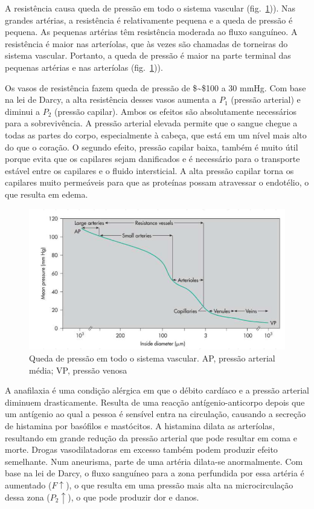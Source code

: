 \documentclass[
  portuguese,
  ]{book}
\begin{document}
A resistência causa queda de pressão em todo o sistema vascular (fig.~\ref{fig:imghemo2})). Nas grandes artérias, a resistência é relativamente pequena e a queda de pressão é pequena. As pequenas artérias têm resistência moderada ao fluxo sanguíneo. A resistência é maior nas arteríolas, que às vezes são chamadas de torneiras do sistema vascular. Portanto, a queda de pressão é maior na parte terminal das pequenas artérias e nas arteríolas (fig.~\ref{fig:imghemo2})).

Os vasos de resistência fazem queda de pressão de \$\sim\$100 a 30 mmHg. Com base na lei de Darcy, a alta resistência desses vasos aumenta a \(P_1\) (pressão arterial) e diminui a \(P_2\) (pressão capilar). Ambos os efeitos são absolutamente necessários para a sobrevivência. A pressão arterial elevada permite que o sangue chegue a todas as partes do corpo, especialmente à cabeça, que está em um nível mais alto do que o coração. O segundo efeito, pressão capilar baixa, também é muito útil porque evita que os capilares sejam danificados e é necessário para o transporte estável entre os capilares e o fluido intersticial. A alta pressão capilar torna os capilares muito permeáveis para que as proteínas possam atravessar o endotélio, o que resulta em edema.

\begin{figure}

{\centering \includegraphics{img/hemo_2} 

}

\caption{Queda de pressão em todo o sistema vascular. AP, pressão arterial média; VP, pressão venosa}\label{fig:imghemo2}
\end{figure}

A anafilaxia é uma condição alérgica em que o débito cardíaco e a pressão arterial diminuem drasticamente. Resulta de uma reacção antígenio-anticorpo depois que um antígenio ao qual a pessoa é sensível entra na circulação, causando a secreção de histamina por basófilos e mastócitos. A histamina dilata as arteríolas, resultando em grande redução da pressão arterial que pode resultar em coma e morte. Drogas vasodilatadoras em excesso também podem produzir efeito semelhante.
Num aneurisma, parte de uma artéria dilata-se anormalmente. Com base na lei de Darcy, o fluxo sanguíneo para a zona perfundida por essa artéria é aumentado (\(F \uparrow\)), o que resulta em uma pressão mais alta na microcirculação dessa zona (\(P_2 \uparrow\)), o que pode produzir dor e danos.
\end{document}
